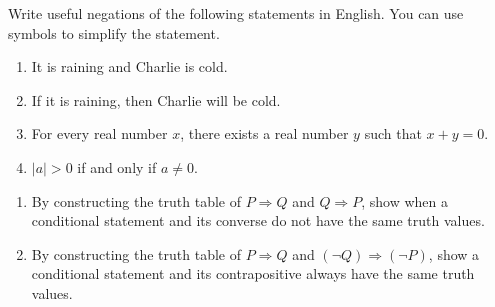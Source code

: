  \begin{problem}
 Write useful negations of the following statements in English. You can use symbols to simplify the statement.
 	\begin{enumerate}[label=\alph*)]
 		\item It is raining and Charlie is cold.
 		\item If it is raining, then Charlie will be cold.
 		\item For every real number $x$, there exists a real number $y$ such that $x  +y = 0$.
 		\item $|a| > 0$ if and only if $a \neq 0$.
 	\end{enumerate}
 \end{problem}

 \begin{problem}
 	\begin{enumerate}[label=\alph*)]
 		\item  By constructing the truth table of $P \Rightarrow Q$ and $Q \Rightarrow P$, show when a conditional statement and its converse do not have the same truth values.
 		\item By constructing the truth table of $P \Rightarrow Q$ and $(\neg Q) \Rightarrow (\neg P)$, show a conditional statement and its contrapositive always have the same truth values.
 	\end{enumerate}
 \end{problem}

